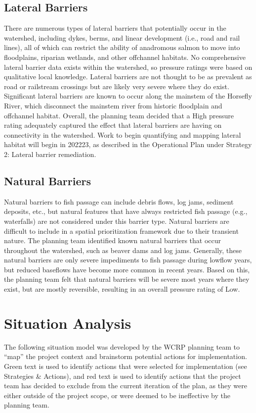 \documentclass[letterpaper,10pt,english]{jupyterBook}
\begin{document}
\section{Lateral Barriers}
\label{\detokenize{EcoAttributes:lateral-barriers}}
\sphinxAtStartPar
There are numerous types of lateral barriers that potentially occur in the watershed, including dykes, berms, and linear development (i.e., road and rail lines), all of which can restrict the ability of anadromous salmon to move into floodplains, riparian wetlands, and other off\sphinxhyphen{}channel habitats. No comprehensive lateral barrier data exists within the watershed, so pressure ratings were based on qualitative local knowledge. Lateral barriers are not thought to be as prevalent as road\sphinxhyphen{} or rail\sphinxhyphen{}stream crossings but are likely very severe where they do exist. Significant lateral barriers are known to occur along the mainstem of the Horsefly River, which disconnect the mainstem river from historic floodplain and off\sphinxhyphen{}channel habitat. Overall, the planning team decided that a High pressure rating adequately captured the effect that lateral barriers are having on connectivity in the watershed. Work to begin quantifying and mapping lateral habitat will begin in 2022\sphinxhyphen{}23, as described in the Operational Plan under Strategy 2: Lateral barrier remediation.


\section{Natural Barriers}
\label{\detokenize{EcoAttributes:natural-barriers}}
\sphinxAtStartPar
Natural barriers to fish passage can include debris flows, log jams, sediment deposits, etc., but natural features that have always restricted fish passage (e.g., waterfalls) are not considered under this barrier type. Natural barriers are difficult to include in a spatial prioritization framework due to their transient nature. The planning team identified known natural barriers that occur throughout the watershed, such as beaver dams and log jams. Generally, these natural barriers are only severe impediments to fish passage during low\sphinxhyphen{}flow years, but reduced baseflows have become more common in recent years. Based on this, the planning team felt that natural barriers will be severe most years where they exist, but are mostly reversible, resulting in an overall pressure rating of Low.


\chapter{Situation Analysis}
\label{\detokenize{EcoAttributes:situation-analysis}}
\sphinxAtStartPar
The following situation model was developed by the WCRP planning team to “map” the project context and brainstorm potential actions for implementation. Green text is used to identify actions that were selected for implementation (see Strategies \& Actions), and red text is used to identify actions that the project team has decided to exclude from the current iteration of the plan, as they were either outside of the project scope, or were deemed to be ineffective by the planning team.
\end{document}
